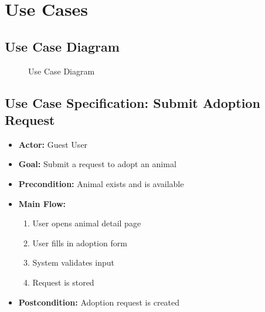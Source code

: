 \section{Use Cases}

\subsection{Use Case Diagram}
\begin{figure}[H]
  \centering
  \caption{Use Case Diagram}
\end{figure}

\subsection{Use Case Specification: Submit Adoption Request}

\begin{itemize}
  \item \textbf{Actor:} Guest User
  \item \textbf{Goal:} Submit a request to adopt an animal
  \item \textbf{Precondition:} Animal exists and is available
  \item \textbf{Main Flow:}
    \begin{enumerate}
      \item User opens animal detail page
      \item User fills in adoption form
      \item System validates input
      \item Request is stored
    \end{enumerate}
  \item \textbf{Postcondition:} Adoption request is created
\end{itemize}

